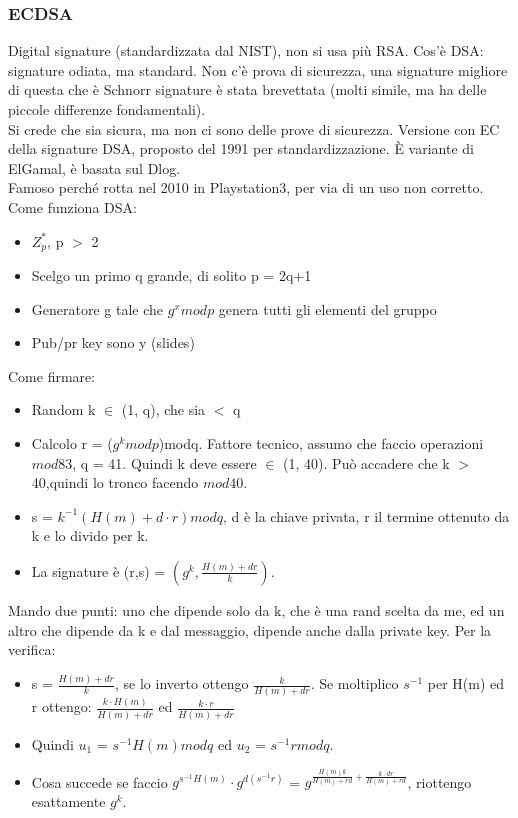 \documentclass[16px]{article}
\begin{document}
\subsubsection{ECDSA}
Digital signature (standardizzata dal NIST), non si usa più RSA. Cos'è DSA: signature odiata, ma standard. Non c'è prova di sicurezza, una signature migliore di questa che è Schnorr signature è stata brevettata (molti simile, ma ha delle piccole differenze fondamentali).\\ Si crede che sia sicura, ma non ci sono delle prove di sicurezza. Versione con EC della signature DSA, proposto del 1991 per standardizzazione. È variante di ElGamal, è basata sul Dlog.\\ Famoso perché rotta nel 2010 in Playstation3, per via di un uso non corretto. Come funziona DSA:
\begin{itemize}
\item $Z_p^*$, p $>$ 2
\item Scelgo un primo q grande, di solito p = 2q+1
\item Generatore g tale che $g^xmodp$ genera tutti gli elementi del gruppo
\item Pub/pr key sono y (slides)
\end{itemize}
Come firmare:
\begin{itemize}
\item Random k $\in$ (1, q), che sia $<$ q
\item Calcolo r = ($g^kmodp$)modq. Fattore tecnico, assumo che faccio operazioni $mod83$, q = 41. Quindi k deve essere $\in$ (1, 40). Può accadere che k $>$ 40,quindi lo tronco facendo $mod40$.
\item s = $k^{-1}(H(m)+d\cdot r)modq$, d è la chiave privata, r il termine ottenuto da k e lo divido per k.
\item La signature è (r,s) = $(g^k, \frac{H(m) + dr}{k})$.
\end{itemize}
Mando due punti: uno che dipende solo da k, che è una rand scelta da me, ed un altro che dipende da k e dal messaggio, dipende anche dalla private key. Per la verifica:
\begin{itemize}
\item s = $\frac{H(m) + dr}{k}$, se lo inverto ottengo $\frac{k}{H(m) + dr}$. Se moltiplico $s^{-1}$ per H(m) ed r ottengo: $\frac{k\cdot H(m)}{H(m) + dr}$ ed $\frac{k\cdot r}{H(m) + dr}$
\item Quindi $u_1$ = $s^{-1}H(m)modq$ ed $u_2$ = $s^{-1}rmodq$.
\item Cosa succede se faccio $g^{s^{-1}H(m)}\cdot g^{d(s^{-1}r)}$ = $g^{\frac{H(m)k}{H(m) +rd} + \frac{k\cdot dr}{H(m) +rd}}$, riottengo esattamente $g^k$.
\end{itemize}
\end{document}
